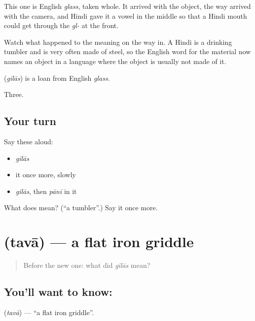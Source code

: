 This one is English \emph{glass}, taken whole. It arrived with the object, the way  arrived with the camera, and Hindi gave it a vowel in the middle so that a Hindi mouth could get through the \emph{gl-} at the front.

Watch what happened to the meaning on the way in. A Hindi  is a drinking tumbler and is very often made of steel, so the English word for the material now names an object in a language where the object is usually not made of it.

\begin{cousinweb}
\textbf{} (\emph{gilās}) is a loan from English \emph{glass}.
\end{cousinweb}

\begin{grammarlens}[title={What you've built}]
Three.
\end{grammarlens}

\subsection*{Your turn}
Say these aloud:

\begin{itemize}
\raggedright
  \item \emph{gilās}
  \item it once more, slowly
  \item \emph{gilās}, then \emph{pānī} in it
\end{itemize}

\begin{tcolorbox}[breakable,colback=teal!4,colframe=teal!35!black,title={Before you move on}]
What does  mean? (\textquotedblleft{}a tumbler\textquotedblright{}.) Say it once more.
\end{tcolorbox}
\section[\texorpdfstring{\hi{तवा} (tavā)}{तवा (tavā)}]{ (tavā) — a flat iron griddle}

\label{lesson:HI-C61-griddle}



\begin{quote}
Before the new one: what did \emph{gilās} mean?
\end{quote}

\subsection*{You'll want to know: }
\textbf{} (\emph{tavā}) — \textquotedblleft{}a flat iron griddle\textquotedblright{}.

